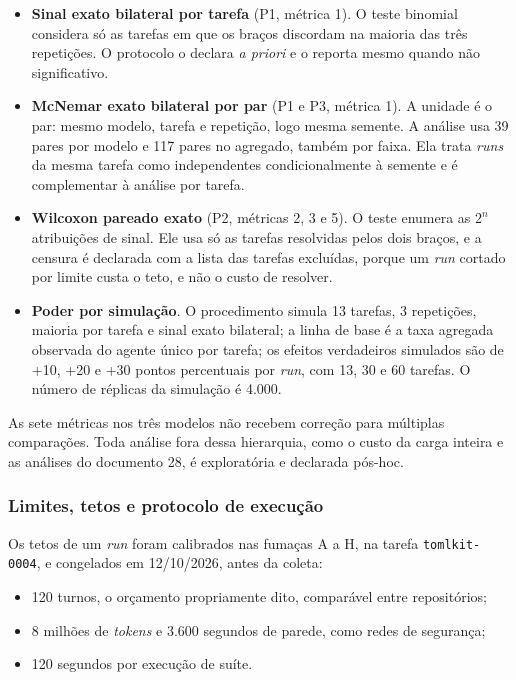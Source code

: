 \begin{itemize}
    \item \textbf{Sinal exato bilateral por tarefa} (P1, métrica 1). O teste binomial considera só as tarefas em que os braços discordam na maioria das três repetições. O protocolo o declara \textit{a priori} e o reporta mesmo quando não significativo.
    \item \textbf{McNemar exato bilateral por par} (P1 e P3, métrica 1). A unidade é o par: mesmo modelo, tarefa e repetição, logo mesma semente. A análise usa 39 pares por modelo e 117 pares no agregado, também por faixa. Ela trata \textit{runs} da mesma tarefa como independentes condicionalmente à semente e é complementar à análise por tarefa.
    \item \textbf{Wilcoxon pareado exato} (P2, métricas 2, 3 e 5). O teste enumera as $2^n$ atribuições de sinal. Ele usa só as tarefas resolvidas pelos dois braços, e a censura é declarada com a lista das tarefas excluídas, porque um \textit{run} cortado por limite custa o teto, e não o custo de resolver.
    \item \textbf{Poder por simulação}. O procedimento simula 13 tarefas, 3 repetições, maioria por tarefa e sinal exato bilateral; a linha de base é a taxa agregada observada do agente único por tarefa; os efeitos verdadeiros simulados são de +10, +20 e +30 pontos percentuais por \textit{run}, com 13, 30 e 60 tarefas. O número de réplicas da simulação é 4.000.
\end{itemize}

As sete métricas nos três modelos não recebem correção para múltiplas comparações. Toda análise fora dessa hierarquia, como o custo da carga inteira e as análises do documento 28, é exploratória e declarada pós-hoc.

\subsubsection{Limites, tetos e protocolo de execução}

Os tetos de um \textit{run} foram calibrados nas fumaças A a H, na tarefa \texttt{tomlkit-0004}, e congelados em 12/10/2026, antes da coleta:

\begin{itemize}
    \item 120 turnos, o orçamento propriamente dito, comparável entre repositórios;
    \item 8 milhões de \textit{tokens} e 3.600 segundos de parede, como redes de segurança;
    \item 120 segundos por execução de suíte.
\end{itemize}

